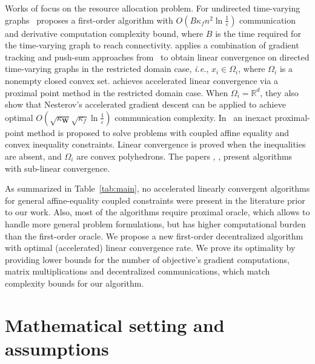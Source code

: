\documentclass{article}
\newcommand{\R}{\mathbb{R}}
\newcommand{\mW}{\mathbf{W}}
\newcommand{\eps}{\varepsilon}
\begin{document}
Works of \cite{doan2017distributed,li2018accelerated,nedic2018improved} focus on the resource allocation problem. 
For undirected time-varying graphs~\cite{doan2017distributed} proposes a first-order algorithm with $O(B\kappa_fn^2\ln\frac1\eps)$ communication and derivative computation complexity bound, where $B$ is the time required for the time-varying graph to reach connectivity.
\cite{li2018accelerated} applies a combination of gradient tracking and push-sum approaches from~\cite{nedic2017achieving} to obtain linear convergence on directed time-varying graphs in the restricted domain case, \textit{i.e.}, $x_i \in \Omega_i$, where $\Omega_i$ is a nonempty closed convex set. 
\cite{nedic2018improved} achieves accelerated linear convergence via a proximal point method in the restricted domain case.
When $\Omega_i = \R^d$, they also show that Nesterov's accelerated gradient descent can be applied to achieve optimal $O(\sqrt{\kappa_\mW}\sqrt{\kappa_f}\ln\frac1\eps)$ communication complexity.
In~\cite{gong2023decentralized} an inexact proximal-point method is proposed to solve problems with coupled affine equality and convex inequality constraints.
Linear convergence is proved when the inequalities are absent, and $\Omega_i$ are convex polyhedrons. The papers \cite{wu2022distributed}, \cite{chang2016proximal}, \cite{falsone2020tracking} present algorithms with sub-linear convergence.

As summarized in Table~\ref{tab:main}, no accelerated linearly convergent algorithms for general affine-equality coupled constraints were present in the literature prior to our work.
Also, most of the algorithms require proximal oracle, which allows to handle more general problem formulations, but has higher computational burden than the first-order oracle.
We propose a new first-order decentralized algorithm with optimal (accelerated) linear convergence rate. 
We prove its optimality by providing lower bounds for the number of objective's gradient computations, matrix multiplications and decentralized communications, which match complexity bounds for our algorithm. 


\section{Mathematical setting and assumptions}\label{sec:mathematical_setting}
\end{document}
